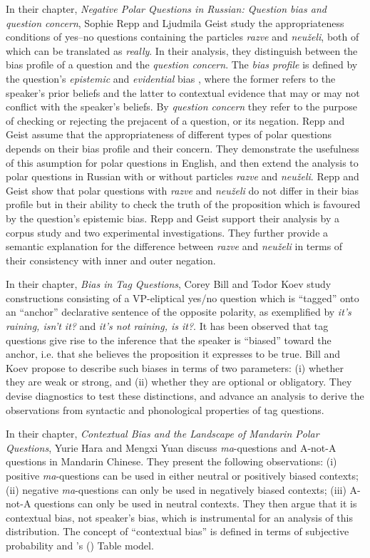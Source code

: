 \documentclass[output=paper,colorlinks,citecolor=brown]{langscibook}
\begin{document}
In their chapter, \textit{Negative Polar Questions in Russian: Question bias and question concern}, Sophie Repp and Ljudmila Geist study the appropriateness conditions of yes--no questions containing the particles \textit{razve} and \textit{neu\v{z}eli}, both of which can be translated as \emph{really}. In their analysis, they distinguish between the bias profile of a question and the \textit{question concern}. The \textit{bias profile} is defined by the question's \textit{epistemic} and \textit{evidential} bias \citep[following][]{s3budo201iased}, where the former refers to the speaker's prior beliefs and the latter to contextual evidence that may or may not conflict with the speaker's beliefs. By \textit{question concern} they refer to the purpose of checking or rejecting the prejacent of a question, or its negation. Repp and Geist assume that the appropriateness of different types of polar questions depends on their bias profile and their concern. They demonstrate the usefulness of this asumption for polar questions in English, and then extend the analysis to polar questions in Russian with or without particles \textit{razve} and \textit{neu\v{z}eli}. Repp and Geist show that polar questions with \textit{razve} and \textit{neu\v{z}eli} do not differ in their bias profile but in their ability to check the truth of the proposition which is favoured by the question's epistemic bias. Repp and Geist support their analysis by a corpus study and two experimental investigations. They further provide a semantic explanation for the difference between \textit{razve} and \textit{neu\v{z}eli} in terms of their consistency with inner and outer negation.

In their chapter, \textit{Bias in Tag Questions}, Corey Bill and Todor Koev study constructions consisting of a VP-eliptical yes/no question which is ``tagged'' onto an ``anchor'' declarative sentence of the opposite polarity, as exemplified by \textit{it's raining, isn't it?} and \textit{it's not raining, is it?}. It has been observed that tag questions give rise to the inference that the speaker is ``biased'' toward the anchor, i.e. that she believes the proposition it expresses to be true. Bill and Koev propose to describe such biases in terms of two parameters: (i) whether they are weak or strong, and (ii) whether they are optional or obligatory. They devise diagnostics to test these distinctions, and advance an analysis to derive the observations from syntactic and phonological properties of tag questions.

In their chapter, \textit{Contextual Bias and the Landscape of Mandarin Polar Questions}, Yurie Hara and Mengxi Yuan discuss \textit{ma}-questions and A-not-A questions in Mandarin Chinese. They present the following observations: (i) positive \textit{ma}-questions can be used in either neutral or positively biased contexts; (ii) negative \textit{ma}-questions can only be used in negatively biased contexts; (iii) A-not-A questions can only be used in neutral contexts. They then argue that it is contextual bias, not speaker's bias, which is instrumental for an analysis of this distribution. The concept of ``contextual bias'' is defined in terms of subjective probability and \citeauthor{farkasbruce2010reacting}'s (\citeyear{farkasbruce2010reacting}) Table model.
\end{document}
